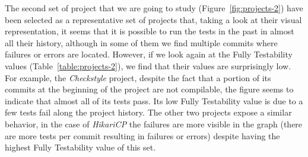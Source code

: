 The second set of project that we are going to study (Figure~\ref{fig:projects-2}) have been selected as a representative set of projects that, taking a look at their visual representation, it seems that it is possible to run the tests in the past in almost all their history, although in some of them we find multiple commits where failures or errors are located.
However, if we look again at the Fully Testability values (Table~\ref{table:projects-2}), we find that their values are surprisingly low. 
For example, the \textit{Checkstyle} project, despite the fact that a portion of its commits at the beginning of the project are not compilable, the figure seems to indicate that almost all of its tests pass. 
Its low Fully Testability value is due to a few tests fail along the project history.
The other two projects expose a similar behavior, in the case of \textit{HikariCP} the failures are more visible in the graph (there are more tests per commit resulting in failures or errors) despite having the highest Fully Testability value of this set.

